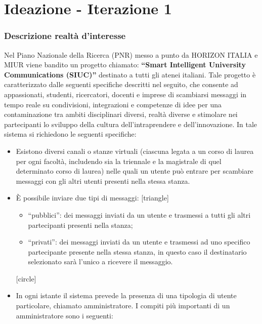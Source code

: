 \documentclass[t]{beamer} %
\newcommand{\virgolette}[1]{``#1''}
\let\olditem=\item%
\renewcommand{\item}{\olditem \justifying}%
\begin{document}
\section{Ideazione - Iterazione 1}
 \begin{frame}[allowframebreaks] 
  \frametitle {Descrizione realtà d'interesse} 
   Nel Piano Nazionale della Ricerca (PNR)  messo a punto da HORIZON ITALIA e MIUR viene bandito un progetto chiamato:\newline
   \textbf{\virgolette{Smart Intelligent University Communications (SIUC)}} destinato a tutti gli atenei italiani.\newline 
   Tale progetto è caratterizzato dalle seguenti specifiche descritti nel seguito, che consente ad appassionati, studenti,    
   ricercatori, docenti e imprese di scambiarsi messaggi in tempo reale su condivisioni, integrazioni e competenze di idee per una contaminazione tra ambiti 
   disciplinari diversi, realtà diverse e stimolare nei partecipanti lo sviluppo della  cultura dell’intraprendere e dell’innovazione.\newline 
   In tale sistema si richiedono le seguenti specifiche:
   \begin{itemize} 
    \item Esistono diversi canali o stanze virtuali (ciascuna legata a un corso di laurea per ogni facoltà, includendo sia la triennale e la magistrale di quel 
          determinato corso di laurea) nelle quali un utente può entrare per scambiare messaggi con gli altri utenti presenti nella stessa stanza.
    \item \`E possibile inviare due tipi di messaggi: 
          [triangle]
          \begin{itemize} 
            \item \virgolette{pubblici}: dei messaggi inviati da un utente e trasmessi a tutti gli altri partecipanti presenti nella stanza; 
            \item \virgolette{privati}: dei messaggi inviati da un utente e trasmessi ad uno specifico partecipante presente nella stessa stanza, in questo caso il 
                                        destinatario selezionato sarà l’unico a ricevere il messaggio.
          \end{itemize}
          [circle]
    \item In ogni istante il sistema prevede la presenza di una tipologia di utente particolare, chiamato amministratore. I compiti più importanti di un 
          amministratore sono i seguenti: 

\end{itemize}
\end{frame}
\end{document}
